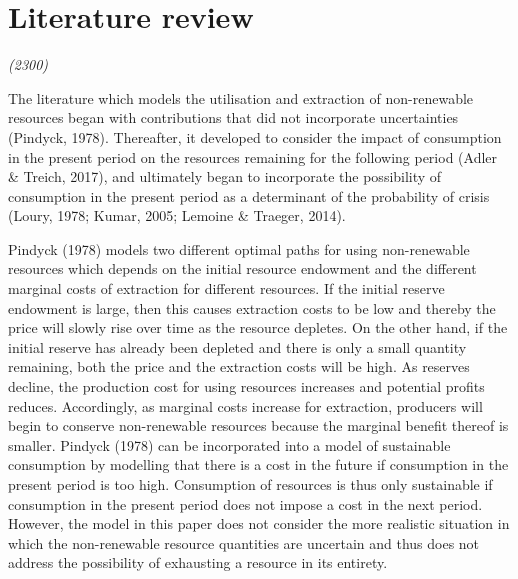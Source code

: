 \documentclass[11pt,preprint, authoryear]{elsarticle}
\numberwithin{equation}{section}
\numberwithin{figure}{section}
\numberwithin{table}{section}
\begin{document}
\hypertarget{literature-review}{%
\section{Literature review}\label{literature-review}}

\emph{(2300)}

The literature which models the utilisation and extraction of
non-renewable resources began with contributions that did not
incorporate uncertainties (Pindyck, 1978). Thereafter, it developed to
consider the impact of consumption in the present period on the
resources remaining for the following period (Adler \& Treich, 2017),
and ultimately began to incorporate the possibility of consumption in
the present period as a determinant of the probability of crisis (Loury,
1978; Kumar, 2005; Lemoine \& Traeger, 2014).

Pindyck (1978) models two different optimal paths for using
non-renewable resources which depends on the initial resource endowment
and the different marginal costs of extraction for different resources.
If the initial reserve endowment is large, then this causes extraction
costs to be low and thereby the price will slowly rise over time as the
resource depletes. On the other hand, if the initial reserve has already
been depleted and there is only a small quantity remaining, both the
price and the extraction costs will be high. As reserves decline, the
production cost for using resources increases and potential profits
reduces. Accordingly, as marginal costs increase for extraction,
producers will begin to conserve non-renewable resources because the
marginal benefit thereof is smaller. Pindyck (1978) can be incorporated
into a model of sustainable consumption by modelling that there is a
cost in the future if consumption in the present period is too high.
Consumption of resources is thus only sustainable if consumption in the
present period does not impose a cost in the next period. However, the
model in this paper does not consider the more realistic situation in
which the non-renewable resource quantities are uncertain and thus does
not address the possibility of exhausting a resource in its entirety.
\end{document}
